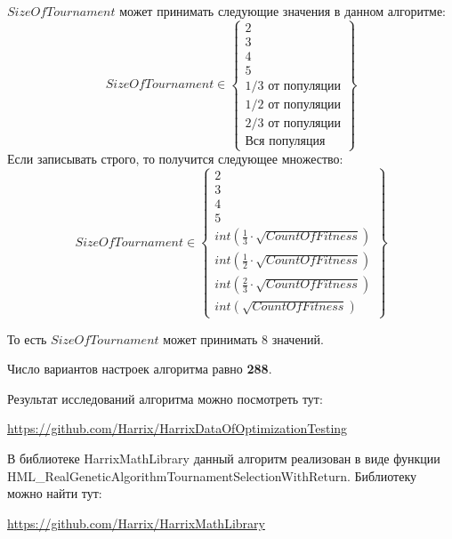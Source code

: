 $SizeOfTournament$ может принимать следующие значения в данном алгоритме:
\begin{equation}
SizeOfTournament \in \begin{Bmatrix}
2\\ 
3\\ 
4\\ 
5\\ 
1/3\text{ от популяции}\\ 
1/2\text{ от популяции}\\ 
2/3\text{ от популяции}\\ 
\text{Вся популяция} 
\end{Bmatrix}
\end{equation}
Если записывать строго, то получится следующее множество:
\begin{equation}
SizeOfTournament \in \begin{Bmatrix}
2\\ 
3\\ 
4\\ 
5\\ 
int\left( \frac{1}{3}\cdot  \sqrt{CountOfFitness}\right)  \\ 
int\left( \frac{1}{2}\cdot  \sqrt{CountOfFitness}\right)\\ 
int\left( \frac{2}{3}\cdot  \sqrt{CountOfFitness}\right)\\ 
int\left( \sqrt{CountOfFitness}\right)
\end{Bmatrix}
\end{equation}

То есть $SizeOfTournament$ может принимать $ 8 $ значений.

Число вариантов настроек алгоритма равно \textbf{288}.

Результат исследований алгоритма можно посмотреть тут:

\href{https://github.com/Harrix/HarrixDataOfOptimizationTesting}{https://github.com/Harrix/HarrixDataOfOptimizationTesting}

В библиотеке HarrixMathLibrary данный алгоритм реализован в виде функции HML\_RealGeneticAlgorithmTournamentSelectionWithReturn. Библиотеку можно найти тут:

\href{https://github.com/Harrix/HarrixMathLibrary}{https://github.com/Harrix/HarrixMathLibrary}